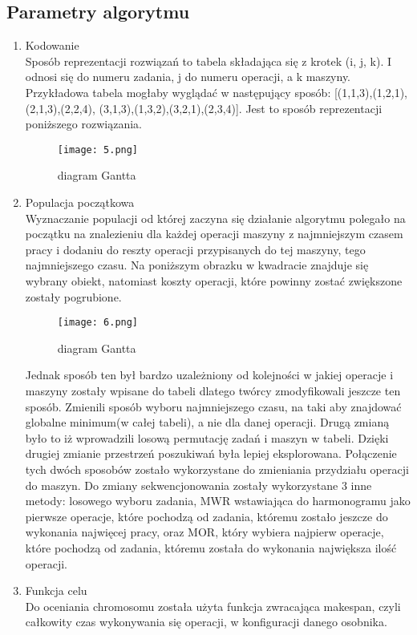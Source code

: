 \documentclass{article}
\begin{document}
 \subsection{Parametry algorytmu}
 \begin{enumerate}
 \item Kodowanie\\
 Sposób reprezentacji rozwiązań to tabela składająca się z krotek (i, j, k). I odnosi się do numeru zadania, j do numeru operacji, a k maszyny. Przykładowa tabela mogłaby wyglądać w następujący sposób:
 [(1,1,3),(1,2,1),(2,1,3),(2,2,4),
 (3,1,3),(1,3,2),(3,2,1),(2,3,4)].
 Jest to sposób reprezentacji poniższego rozwiązania.
 \begin{figure}[H]
 \centering
 \texttt{[image: 5.png]}
 \caption{diagram Gantta}
 \end{figure}

 \item Populacja początkowa\\
 Wyznaczanie populacji od której zaczyna się działanie algorytmu polegało na początku na znalezieniu dla każdej operacji maszyny z najmniejszym czasem pracy i dodaniu do reszty operacji przypisanych do tej maszyny, tego najmniejszego czasu. Na poniższym obrazku w kwadracie znajduje się wybrany obiekt, natomiast koszty operacji, które powinny zostać zwiększone zostały pogrubione.
 \begin{figure}[H]
 \centering
 \texttt{[image: 6.png]}
 \caption{diagram Gantta}
 \end{figure}
 Jednak sposób ten był bardzo uzależniony od kolejności w jakiej operacje i maszyny zostały wpisane do tabeli dlatego twórcy zmodyfikowali jeszcze ten sposób. Zmienili sposób wyboru najmniejszego czasu, na taki aby znajdować globalne minimum(w całej tabeli), a nie dla danej operacji. Drugą zmianą było to iż wprowadzili losową permutację zadań i maszyn w tabeli. Dzięki drugiej zmianie przestrzeń poszukiwań była lepiej eksplorowana. Połączenie tych dwóch sposobów zostało wykorzystane do zmieniania przydziału operacji do maszyn. Do zmiany sekwencjonowania zostały wykorzystane 3 inne metody: losowego wyboru zadania, MWR wstawiająca do harmonogramu jako pierwsze operacje, które pochodzą od zadania, któremu zostało jeszcze do wykonania najwięcej pracy, oraz MOR, który wybiera najpierw operacje, które pochodzą od zadania, któremu została do wykonania największa ilość operacji.


 \item Funkcja celu\\
 Do oceniania chromosomu została użyta funkcja zwracająca makespan, czyli całkowity czas wykonywania się operacji, w konfiguracji danego osobnika.


\end{enumerate}
\end{document}
